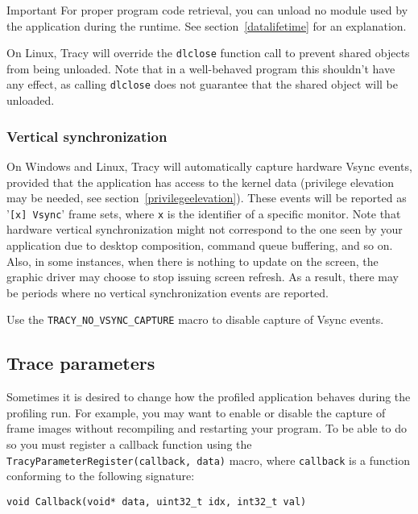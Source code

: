 \documentclass[hidelinks,titlepage,a4paper,twoside]{article}
\begin{document}
\begin{bclogo}[
noborder=true,
couleur=black!5,
logo=\bcbombe
]{Important}
For proper program code retrieval, you can unload no module used by the application during the runtime. See section~\ref{datalifetime} for an explanation.

On Linux, Tracy will override the \texttt{dlclose} function call to prevent shared objects from being unloaded. Note that in a well-behaved program this shouldn't have any effect, as calling \texttt{dlclose} does not guarantee that the shared object will be unloaded.
\end{bclogo}

\subsubsection{Vertical synchronization}

On Windows and Linux, Tracy will automatically capture hardware Vsync events, provided that the application has access to the kernel data (privilege elevation may be needed, see section~\ref{privilegeelevation}). These events will be reported as '\texttt{[x] Vsync}' frame sets, where \texttt{x} is the identifier of a specific monitor. Note that hardware vertical synchronization might not correspond to the one seen by your application due to desktop composition, command queue buffering, and so on. Also, in some instances, when there is nothing to update on the screen, the graphic driver may choose to stop issuing screen refresh. As a result, there may be periods where no vertical synchronization events are reported.

Use the \texttt{TRACY\_NO\_VSYNC\_CAPTURE} macro to disable capture of Vsync events.

\subsection{Trace parameters}
\label{traceparameters}

Sometimes it is desired to change how the profiled application behaves during the profiling run. For example, you may want to enable or disable the capture of frame images without recompiling and restarting your program. To be able to do so you must register a callback function using the \texttt{TracyParameterRegister(callback, data)} macro, where \texttt{callback} is a function conforming to the following signature:

\begin{lstlisting}
void Callback(void* data, uint32_t idx, int32_t val)
\end{lstlisting}
\end{document}
